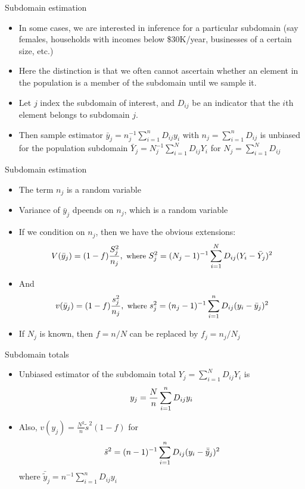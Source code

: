 \documentclass[
  ignorenonframetext,
]{beamer}
\providecommand{\tightlist}{%
  \setlength{\itemsep}{0pt}\setlength{\parskip}{0pt}}
\begin{document}
\begin{frame}{Subdomain estimation}
\protect\hypertarget{subdomain-estimation}{}

\begin{itemize}
\item
  In some cases, we are interested in inference for a particular
  subdomain (say females, households with incomes below \$30K/year,
  businesses of a certain size, etc.)
\item
  Here the distinction is that we often cannot ascertain whether an
  element in the population is a member of the subdomain until we sample
  it.
\item
  Let \(j\) index the subdomain of interest, and \(D_{ij}\) be an
  indicator that the \(i\)th element belongs to subdomain \(j\).
\item
  Then sample estimator \(\bar y_j = n_j^{-1} \sum_{i=1}^n D_{ij} y_i\)
  with \(n_{j} = \sum_{i=1}^n D_{ij}\) is unbiased for the population
  subdomain \(\bar Y_j = N_j^{-1} \sum_{i=1}^N D_{ij} Y_i\) for
  \(N_j = \sum_{i=1}^N D_{ij}\)
\end{itemize}

\end{frame}

\begin{frame}{Subdomain estimation}
\protect\hypertarget{subdomain-estimation-1}{}

\begin{itemize}
\tightlist
\item
  The term \(n_j\) is a random variable
\item
  Variance of \(\bar y_j\) dpeends on \(n_j\), which is a random
  variable
\item
  If we condition on \(n_j\), then we have the obvious extensions:
  \[ \small
  V(\bar y_j) = (1-f) \frac{S_j^2}{n_j}, \text{ where } S_j^2 = (N_j - 1)^{-1} \sum_{i=1}^N D_{ij} (Y_i - \bar Y_j)^2
  \]
\item
  And \[ \small
  v(\bar y_j) = (1-f) \frac{s_j^2}{n_j}, \text{ where } s_j^2 = (n_j - 1)^{-1} \sum_{i=1}^n D_{ij} (y_i - \bar y_j)^2
  \]
\item
  If \(N_j\) is known, then \(f = n/N\) can be replaced by
  \(f_j = n_j / N_j\)
\end{itemize}

\end{frame}

\begin{frame}{Subdomain totals}
\protect\hypertarget{subdomain-totals}{}

\begin{itemize}
\tightlist
\item
  Unbiased estimator of the subdomain total
  \(Y_j = \sum_{i=1}^N D_{ij} Y_i\) is \[\small 
  y_j = \frac{N}{n} \sum_{i=1}^n D_{ij} y_i
  \]
\item
  Also, \(v(y_j) = \frac{N^2}{n} \tilde s^2 (1-f)\) for \[\small
  \tilde s^2 = (n-1)^{-1} \sum_{i=1}^n D_{ij} (y_i - \bar{\tilde y}_j)^2
  \] where \(\bar{\tilde y}_j = n^{-1} \sum_{i=1}^n D_{ij} y_i\)
\end{itemize}

\end{frame}
\end{document}
